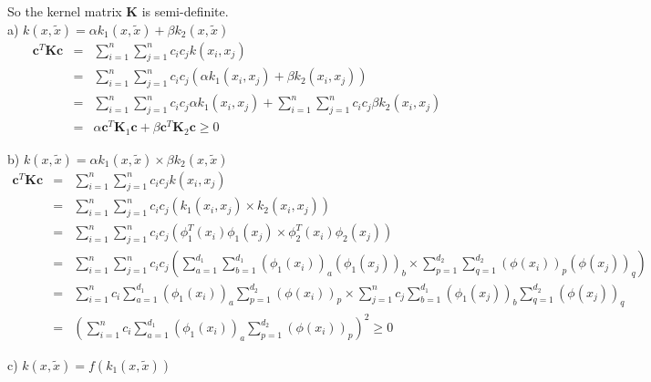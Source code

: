 \documentclass[12pt]{article}
\begin{document}
So the kernel matrix \textbf{K} is semi-definite. \\

a) $k(x, \tilde{x}) = \alpha k_1(x, \tilde{x}) + \beta k_2(x, \tilde{x})$
\begin{eqnarray*}
  \textbf{c}^T \textbf{Kc}
  &=& \sum_{i=1}^n \sum_{j=1}^n c_i c_j k(x_i,x_j) \\
  &=& \sum_{i=1}^n \sum_{j=1}^n c_i c_j 
  \left( \alpha k_1(x_i,x_j) + \beta k_2(x_i,x_j) \right) \\
  &=& \sum_{i=1}^n \sum_{j=1}^n c_i c_j \alpha k_1(x_i,x_j)
  + \sum_{i=1}^n \sum_{j=1}^n c_i c_j \beta k_2(x_i,x_j) \\
  &=& \alpha \textbf{c}^T \textbf{K}_1 \textbf{c}
  + \beta \textbf{c}^T \textbf{K}_2 \textbf{c} \ge 0
\end{eqnarray*}

b) $k(x, \tilde{x}) = \alpha k_1(x, \tilde{x}) \times \beta k_2(x, \tilde{x})$
\begin{eqnarray*}
  \textbf{c}^T \textbf{Kc}
  &=& \sum_{i=1}^n \sum_{j=1}^n c_i c_j k(x_i,x_j) \\
  &=& \sum_{i=1}^n \sum_{j=1}^n c_i c_j 
  \left( k_1(x_i,x_j) \times k_2(x_i,x_j) \right) \\
  &=& \sum_{i=1}^n \sum_{j=1}^n c_i c_j 
  \left( \phi_1^T(x_i) \phi_1(x_j) \times \phi_2^T(x_i) \phi_2(x_j) \right) \\
  &=& \sum_{i=1}^n \sum_{j=1}^n c_i c_j 
  \left( \sum_{a=1}^{d_1} \sum_{b=1}^{d_1} (\phi_1(x_i))_a (\phi_1(x_j))_b 
  \times \sum_{p=1}^{d_2} \sum_{q=1}^{d_2} (\phi(x_i))_p (\phi(x_j))_q \right) \\
  &=& \sum_{i=1}^n c_i \sum_{a=1}^{d_1} (\phi_1(x_i))_a \sum_{p=1}^{d_2}
  (\phi(x_i))_p \times \sum_{j=1}^n c_j \sum_{b=1}^{d_1}
  (\phi_1(x_j))_b \sum_{q=1}^{d_2} (\phi(x_j))_q \\
  &=& \left( \sum_{i=1}^n c_i \sum_{a=1}^{d_1} (\phi_1(x_i))_a \sum_{p=1}^{d_2}
  (\phi(x_i))_p \right)^2 \ge 0
\end{eqnarray*}

c) $k(x, \tilde{x}) = f(k_1(x, \tilde{x}))$ \\
\end{document}
